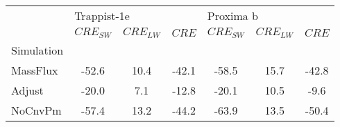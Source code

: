 \begin{tabular}{lcccccc}
\toprule
{} & \multicolumn{3}{l}{Trappist-1e} & \multicolumn{3}{l}{Proxima b} \\
{} &  $CRE_{SW}$ & $CRE_{LW}$ & $CRE$ & $CRE_{SW}$ & $CRE_{LW}$ & $CRE$ \\
Simulation &             &            &       &            &            &       \\
\midrule
MassFlux   &       -52.6 &       10.4 & -42.1 &      -58.5 &       15.7 & -42.8 \\
Adjust     &       -20.0 &        7.1 & -12.8 &      -20.1 &       10.5 &  -9.6 \\
NoCnvPm    &       -57.4 &       13.2 & -44.2 &      -63.9 &       13.5 & -50.4 \\
\bottomrule
\end{tabular}
